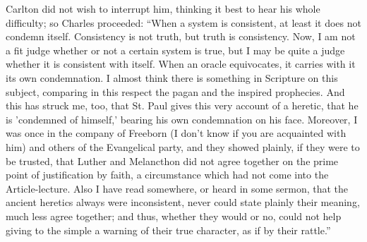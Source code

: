 Carlton did not wish to interrupt him, thinking it best to hear his
whole difficulty; so Charles proceeded: ``When a system is
consistent, at least it does not condemn itself. Consistency is not
truth, but truth is consistency. Now, I am not a fit judge whether or
not a certain system is true, but I may be quite a judge whether it is
consistent with itself. When an oracle equivocates, it carries with it
its own condemnation. I almost think there is something in Scripture
on this subject, comparing in this respect the pagan and the inspired
prophecies. And this has struck me, too, that St. Paul gives this very
account of a heretic, that he is 'condemned of himself,' bearing his
own condemnation on his face. Moreover, I was once in the company of
Freeborn (I don't know if you are acquainted with him) and others of
the Evangelical party, and they showed plainly, if they were to be
trusted, that Luther and Melancthon did not agree together on the
prime point of justification by faith, a circumstance which had not
come into the Article-lecture. Also I have read somewhere, or heard in
some sermon, that the ancient heretics always were inconsistent, never
could state plainly their meaning, much less agree together; and thus,
whether they would or no, could not help giving to the simple a
warning of their true character, as if by their rattle.''

